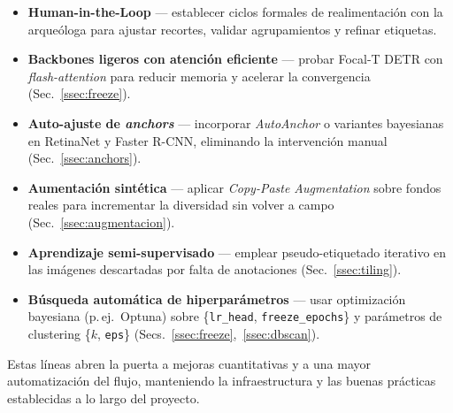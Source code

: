 \begin{itemize}
  \item \textbf{Human-in-the-Loop} — establecer ciclos formales de realimentación con la arqueóloga para ajustar recortes, validar agrupamientos y refinar etiquetas.
  \item \textbf{Backbones ligeros con atención eficiente} — probar Focal-T DETR con \emph{flash-attention} para reducir memoria y acelerar la convergencia (Sec.~\ref{ssec:freeze}).
  \item \textbf{Auto-ajuste de \emph{anchors}} — incorporar \textit{AutoAnchor} o variantes bayesianas en RetinaNet y Faster R-CNN, eliminando la intervención manual (Sec.~\ref{ssec:anchors}).
  \item \textbf{Aumentación sintética} — aplicar \emph{Copy-Paste Augmentation} sobre fondos reales para incrementar la diversidad sin volver a campo (Sec.~\ref{ssec:augmentacion}).
  \item \textbf{Aprendizaje semi-supervisado} — emplear pseudo-etiquetado iterativo en las imágenes descartadas por falta de anotaciones (Sec.~\ref{ssec:tiling}).
  \item \textbf{Búsqueda automática de hiperparámetros} — usar optimización bayesiana (p.\,ej.\ Optuna) sobre \{\texttt{lr\_head}, \texttt{freeze\_epochs}\} y parámetros de clustering \{\(k\), \texttt{eps}\} (Secs.~\ref{ssec:freeze},~\ref{ssec:dbscan}).
\end{itemize}

Estas líneas abren la puerta a mejoras cuantitativas y a una mayor automatización del flujo, manteniendo la infraestructura y las buenas prácticas establecidas a lo largo del proyecto.
